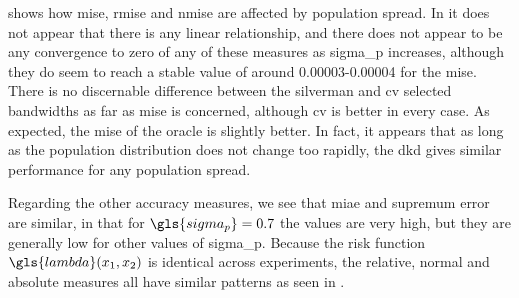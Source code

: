  shows how \gls{mise}, \gls{rmise} and \gls{nmise} are affected by population spread.
In  it does not appear that there is any linear relationship,
and there does not appear to be any convergence to zero of any of these measures as \gls{sigma_p} increases,
although they do seem to reach a stable value of around 0.00003-0.00004 for the \gls{mise}.
There is no discernable difference between the \gls{silverman} and \gls{cv} selected bandwidths as far as \gls{mise} is concerned,
although \gls{cv} is better in every case.
As expected, the \gls{mise} of the \gls{oracle} is slightly better.
In fact, it appears that as long as the population distribution does not change too rapidly,
the \gls{dkd} gives similar performance for any population \gls{spread}.

Regarding the other accuracy measures, we see that \gls{miae} and \gls{supremum error} are similar,
in that for $\gls{sigma_p} = 0.7$ the values are very high,
but they are generally low for other values of \gls{sigma_p}.
Because the risk function $\gls{lambda} \xvec$ is identical across experiments,
the relative, normal and absolute measures all have similar patterns
as seen in .

